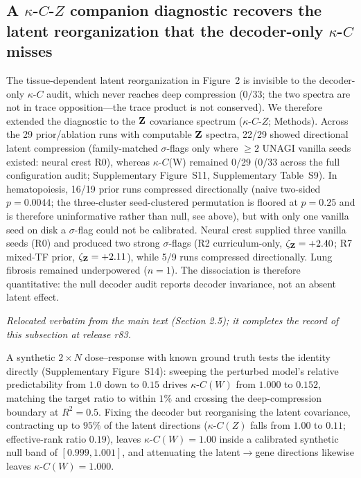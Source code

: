 \documentclass[11 pt,a4 paper]{article}
\begin{document}
\subsection*{A $\kappa$-$C$-$Z$ companion diagnostic recovers the latent reorganization that the decoder-only $\kappa$-$C$ misses}

The tissue-dependent latent reorganization in Figure~2 is invisible to the decoder-only $\kappa$-$C$ audit, which never reaches deep compression ($0/33$; the two spectra are not in trace opposition---the trace product is not conserved). We therefore extended the diagnostic to the $\mathbf{Z}$ covariance spectrum ($\kappa$-$C$-$Z$; Methods). Across the 29 prior/ablation runs with computable $\mathbf{Z}$ spectra, 22/29 showed directional latent compression (family-matched $\sigma$-flags only where $\geq2$ UNAGI vanilla seeds existed: neural crest R0), whereas $\kappa$-$C$(W) remained 0/29 (0/33 across the full configuration audit; Supplementary Figure~S11, Supplementary Table~S9). In hematopoiesis, 16/19 prior runs compressed directionally (naive two-sided $p=0.0044$; the three-cluster seed-clustered permutation is floored at $p=0.25$ and is therefore uninformative rather than null, see above), but with only one vanilla seed on disk a $\sigma$-flag could not be calibrated. Neural crest supplied three vanilla seeds (R0) and produced two strong $\sigma$-flags (R2 curriculum-only, $\zeta_{\mathbf{Z}}=+2.40$; R7 mixed-TF prior, $\zeta_{\mathbf{Z}}=+2.11$), while 5/9 runs compressed directionally. Lung fibrosis remained underpowered ($n=1$). The dissociation is therefore quantitative: the null decoder audit reports decoder invariance, not an absent latent effect.

\noindent\emph{Relocated verbatim from the main text (Section 2.5); it completes the record of this subsection at release r83.}

A synthetic $2\times N$ dose--response with known ground truth tests the identity directly (Supplementary Figure~S14): sweeping the perturbed model's relative predictability from $1.0$ down to $0.15$ drives $\kappa$-$C(W)$ from $1.000$ to $0.152$, matching the target ratio to within $1\%$ and crossing the deep-compression boundary at $R^2=0.5$. Fixing the decoder but reorganising the latent covariance, contracting up to $95\%$ of the latent directions ($\kappa$-$C(Z)$ falls from $1.00$ to $0.11$; effective-rank ratio $0.19$), leaves $\kappa$-$C(W)=1.00$ inside a calibrated synthetic null band of $[0.999,1.001]$, and attenuating the latent$\to$gene directions likewise leaves $\kappa$-$C(W)=1.000$.
\end{document}
